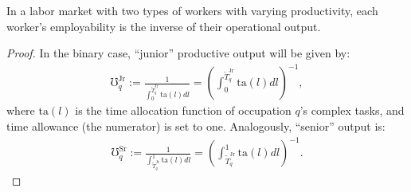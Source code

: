 \documentclass[hidelinks, nonatbib]{elsarticle}
\begin{document}
\begin{theorem}
    \label{bet}
    In a labor market with two types of workers with varying productivity, each worker's employability is the inverse of their operational output.
    \begin{proof}
        In the binary case, ``junior'' productive output will be given by:
        \begin{gather}
            \mho_{q}^{\text{Jr}} 
            :=
            \frac{
                1
            }{
                \int_{0}^{\tilde{T}_{q}^{\text{Jr}}}
                \text{ta}(l)
                dl
            }
            = 
            \left(
                \int_{0}^{\tilde{T}_{q}^{\text{Jr}}}
                    \text{ta}(l)
                    dl
            \right) ^ {-1}
            ,
        \end{gather}
        where $\text{ta}(l)$ is the time allocation function of occupation $q$'s complex tasks, and time allowance (the numerator) is set to one. Analogously, ``senior'' output is:
        \begin{gather}
            \mho_{q}^{\text{Sr}}
            :=
            \frac{
                1
            }{
                \int_{\tilde{T}_{q}^{\text{Jr}}}^{1}
                \text{ta}(l)
                dl
            }
            = 
            \left(
                \int_{\tilde{T}_{q}^{\text{Jr}}}^{1}
                    \text{ta}(l)
                    dl
            \right) ^ {-1}
            .
        \end{gather}


\end{proof}
\end{theorem}
\end{document}
